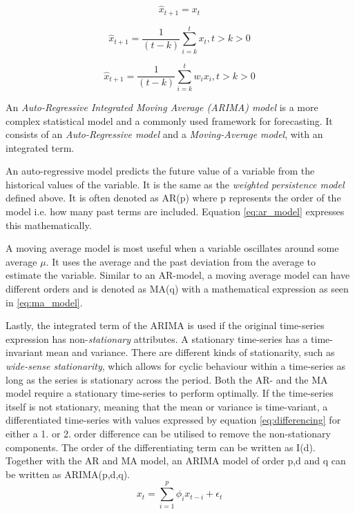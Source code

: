 \begin{equation}
    \hat{x}_{t+1} = x_{t}
    \label{eq:persistence}
\end{equation}

\begin{equation}
    \hat{x}_{t+1} = \frac{1}{(t-k)}\sum_{i=k}^{t}{x_t}     ,t>k>0
    \label{eq:persistence_avg}
\end{equation}

\begin{equation}
    \hat{x}_{t+1} = \frac{1}{(t-k)}\sum_{i=k}^{t}{w_i x_i}     ,t>k>0
    \label{eq:weighted_persistence_avg}
\end{equation}

An \textit{Auto-Regressive Integrated Moving Average (ARIMA) model} is a more complex statistical model and a commonly used framework for forecasting. It consists of an \textit{Auto-Regressive model} and a \textit{Moving-Average model}, with an integrated term. 

An auto-regressive model predicts the future value of a variable from the historical values of the variable. It is the same as the \textit{weighted persistence model} defined above. It is often denoted as AR(p) where p represents the order of the model i.e. how many past terms are included. Equation \ref{eq:ar_model} expresses this mathematically. 

A moving average model is most useful when a variable oscillates around some average $\mu$. It uses the average and the past deviation from the average to estimate the variable. Similar to an AR-model, a moving average model can have different orders and is denoted as MA(q) with a mathematical expression as seen in \ref{eq:ma_model}.

Lastly, the integrated term of the ARIMA is used if the original time-series expression has non-\textit{stationary} attributes. A stationary time-series has a time-invariant mean and variance. There are different kinds of stationarity, such as \textit{wide-sense stationarity}, which allows for cyclic behaviour within a time-series as long as the series is stationary across the period. Both the AR- and the MA model require a stationary time-series to perform optimally. If the time-series itself is not stationary, meaning that the mean or variance is time-variant, a differentiated time-series with values expressed by equation \ref{eq:differencing} for either a 1. or 2. order difference can be utilised to remove the non-stationary components. The order of the differentiating term can be written as I(d). Together with the AR and MA model, an ARIMA model of order p,d and q can be written as ARIMA(p,d,q).
\begin{equation}
    x_t = \sum_{i=1}^{p}{\phi_i x_{t-i}} + \epsilon_t
    \label{eq:ar_model}
\end{equation}


